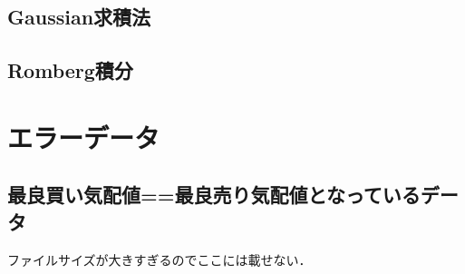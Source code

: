 \documentclass[a4j,papersize,disablejfam,slide,14pt]{jsarticle}
\begin{document}
    
\subsection{{\rm Gaussian}求積法}

\subsection{{\rm Romberg}積分}

\section{エラーデータ}
\label{sec:appendix_errordata}
\subsection{最良買い気配値==最良売り気配値となっているデータ}
    ファイルサイズが大きすぎるのでここには載せない．
\end{document}
